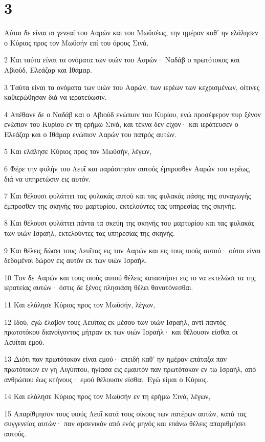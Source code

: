 \chapter{3}

\par Αύται δε είναι αι γενεαί του Ααρών και του Μωϋσέως, την ημέραν καθ' ην ελάλησεν ο Κύριος προς τον Μωϋσήν επί του όρους Σινά.
\par 2 Και ταύτα είναι τα ονόματα των υιών του Ααρών· Ναδάβ ο πρωτότοκος και Αβιούδ, Ελεάζαρ και Ιθάμαρ.
\par 3 Ταύτα είναι τα ονόματα των υιών του Ααρών, των ιερέων των κεχρισμένων, οίτινες καθιερώθησαν διά να ιερατεύωσιν.
\par 4 Απέθανε δε ο Ναδάβ και ο Αβιούδ ενώπιον του Κυρίου, ενώ προσέφερον πυρ ξένον ενώπιον του Κυρίου εν τη ερήμω Σινά, και τέκνα δεν είχον· και ιεράτευσεν ο Ελεάζαρ και ο Ιθάμαρ ενώπιον Ααρών του πατρός αυτών.
\par 5 Και ελάλησε Κύριος προς τον Μωϋσήν, λέγων,
\par 6 Φέρε την φυλήν του Λευΐ και παράστησον αυτούς έμπροσθεν Ααρών του ιερέως, διά να υπηρετώσιν εις αυτόν.
\par 7 Και θέλουσι φυλάττει τας φυλακάς αυτού και τας φυλακάς πάσης της συναγωγής έμπροσθεν της σκηνής του μαρτυρίου, εκτελούντες τας υπηρεσίας της σκηνής.
\par 8 Και θέλουσι φυλάττει πάντα τα σκεύη της σκηνής του μαρτυρίου και τας φυλακάς των υιών Ισραήλ, εκτελούντες τας υπηρεσίας της σκηνής.
\par 9 Και θέλεις δώσει τους Λευΐτας εις τον Ααρών και εις τους υιούς αυτού· ούτοι είναι δεδομένοι δώρον εις αυτόν εκ των υιών Ισραήλ.
\par 10 Τον δε Ααρών και τους υιούς αυτού θέλεις καταστήσει εις το να εκτελώσι τα της ιερατείας αυτών· όστις δε ξένος πλησιάση θέλει θανατόνεσθαι.
\par 11 Και ελάλησε Κύριος προς τον Μωϋσήν, λέγων,
\par 12 Ιδού, εγώ έλαβον τους Λευΐτας εκ μέσου των υιών Ισραήλ, αντί παντός πρωτοτόκου διανοίγοντος μήτραν εκ των υιών Ισραήλ· και θέλουσιν είσθαι οι Λευΐται εμού.
\par 13 Διότι παν πρωτότοκον είναι εμού· επειδή καθ' ην ημέραν επάταξα παν πρωτότοκον εν γη Αιγύπτου, ηγίασα εις εμαυτόν παν πρωτότοκον εν τω Ισραήλ, από ανθρώπου έως κτήνους· εμού θέλουσιν είσθαι. Εγώ είμαι ο Κύριος.
\par 14 Και ελάλησε Κύριος προς τον Μωϋσήν εν τη ερήμω Σινά, λέγων,
\par 15 Απαρίθμησον τους υιούς Λευΐ κατά τους οίκους των πατέρων αυτών, κατά τας συγγενείας αυτών· παν αρσενικόν από ενός μηνός και επάνω θέλεις απαριθμήσει αυτούς.

